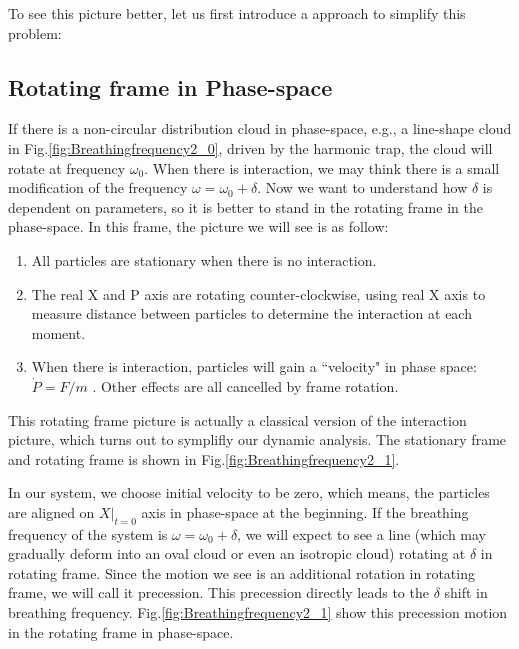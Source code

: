 \documentclass[aps,preprintnumbers,onecolumn,amsmath,amssymb,floatfix,pra]{revtex4-1}
\begin{document}
To see this picture better, let us first introduce a approach to simplify this problem:

\subsection{Rotating frame in Phase-space}
If there is a non-circular distribution cloud in phase-space, e.g., a line-shape cloud in
Fig.\ref{fig:Breathingfrequency2_0}, driven by the harmonic trap, the cloud will rotate at frequency
$\omega_0$. When there is interaction, we may think there is a small modification of the frequency
$\omega=\omega_0+\delta$. Now we want to understand how $\delta$ is dependent on parameters, so it
is better to stand in the rotating frame in the phase-space. In this frame, the picture we will see
is as follow:\\
\begin{enumerate}[\textbf{*}]
\item All particles are stationary when there is no interaction.
\item The real X and P axis are rotating counter-clockwise, using real X axis to measure distance between particles to determine the interaction at each moment.
\item When there is interaction, particles will gain a ``velocity" in phase space: $\dot{P}=F/m$ . Other effects are all cancelled by frame rotation.
\end{enumerate}


This rotating frame picture is actually a classical version of the interaction picture, which turns out to symplifly our dynamic analysis. The stationary frame and rotating frame is shown in Fig.\ref{fig:Breathingfrequency2_1}.

In our system, we choose initial velocity to be zero, which means, the particles are aligned on $X|_{t=0}$ axis in phase-space at the beginning. If the breathing frequency of the system is $\omega=\omega_0+\delta$, we will expect to see a line (which may gradually deform into an oval cloud or even an isotropic cloud) rotating at $\delta$ in rotating frame. Since the motion we see is an additional rotation in rotating frame, we will call it precession. This precession directly leads to the $\delta$ shift in breathing frequency. Fig.\ref{fig:Breathingfrequency2_1} show this precession motion in the rotating frame in phase-space.
\end{document}
